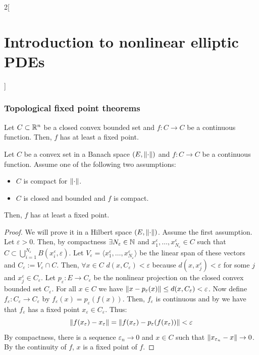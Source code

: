\documentclass[../../../main_math.tex]{subfiles}
\begin{document}
\begin{multicols}{2}[\section{Introduction to nonlinear elliptic PDEs}]
  \subsubsection{Topological fixed point theorems}
  \begin{theorem}\label{INEPDE:Brower}
    Let $C\subset \mathbb{R}^n$ be a closed convex bounded set and $f:C\to C$ be a continuous function. Then, $f$ has at least a fixed point.
  \end{theorem}
  \begin{theorem}\label{INEPDE:schauder_fixed_point}
    Let $C$ be a convex set in a Banach space $(E,\left\|\cdot\right\|)$ and $f:C\to C$ be a continuous function. Assume one of the following two assumptions:
    \begin{itemize}
      \item $C$ is compact for $\left\|\cdot\right\|$.
      \item $C$ is closed and bounded and $f$ is compact.
    \end{itemize}
    Then, $f$ has at least a fixed point.
  \end{theorem}
  \begin{proof}
    We will prove it in a Hilbert space $(E,\left\|\cdot\right\|)$. Assume the first assumption. Let $\varepsilon>0$. Then, by compactness $\exists N_\varepsilon\in\mathbb{N}$ and $x_1^\varepsilon,\dots,x_{N_\varepsilon}^\varepsilon\in C$ such that $C\subset \bigcup_{i=1}^{N_\varepsilon}B(x_i^\varepsilon,\varepsilon)$. Let $V_\varepsilon=\langle x_1^\varepsilon,\dots,x_{N_\varepsilon}^\varepsilon\rangle$ be the linear span of these vectors and $C_\varepsilon:=V_\varepsilon\cap C$. Then, $\forall x\in C$ $d(x,C_\varepsilon)< \varepsilon$ because $d(x,x_j^\varepsilon)<\varepsilon$ for some $j$ and $x_j^\varepsilon\in C_\varepsilon$. Let $p_\varepsilon:E\to C_\varepsilon$ be the nonlinear projection on the closed convex bounded set $C_\varepsilon$. For all $x\in C$ we have $\left\|x-p_\varepsilon(x)\right\|\leq d(x,C_\varepsilon)<\varepsilon$. Now define $f_\varepsilon:C_\varepsilon\to C_\varepsilon$ by $f_\varepsilon(x)=p_\varepsilon(f(x))$. Then, $f_\varepsilon$ is continuous and by  we have that $f_\varepsilon$ has a fixed point $x_\varepsilon\in C_\varepsilon$. Thus:
    $$
      \left\|f(x_\varepsilon)-x_\varepsilon\right\|=\left\|f(x_\varepsilon)-p_\varepsilon(f(x_\varepsilon))\right\|<\varepsilon
    $$
    By compactness, there is a sequence $\varepsilon_n\to 0$ and $x\in C$ such that $\left\|x_{\varepsilon_n}-x\right\|\to 0$. By the continuity of $f$, $x$ is a fixed point of $f$.


\end{proof}
\end{multicols}
\end{document}
